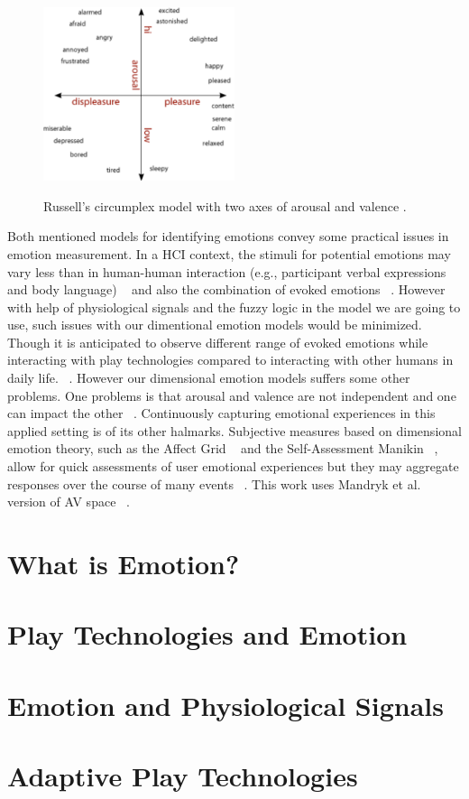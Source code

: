 \begin{figure}[h!]
  \caption[Russell's arousal and valence model]
  {Russell's circumplex model with two axes of arousal and valence \footnotemark.}
  \centering
  \includegraphics[width=0.5\textwidth]{images/russell-av-space.pdf}
  \label{fig:russelavspace}
\end{figure}


Both mentioned models for identifying emotions convey some
practical issues in emotion measurement. In a HCI context, the 
stimuli for potential emotions may vary less than
in human-human interaction (e.g., participant verbal expressions and body language) 
~\cite{zhang2010service} and also the combination of
evoked emotions ~\cite{peter2006emotion}. However with help of physiological
signals and the fuzzy logic in the model we are going to
use, such issues with our dimentional emotion models would
be minimized. Though it is anticipated to observe different range 
of evoked emotions while interacting with play
technologies compared to interacting with other humans in
daily life. ~\cite{zhang2010service}. However our dimensional emotion models
suffers some other problems. One problems is that arousal
and valence are not independent and one can impact the
other ~\cite{mandryk2007fuzzy}. Continuously capturing emotional experiences
in this applied setting is of its other halmarks. Subjective
measures based on dimensional emotion theory, such as the
Affect Grid ~\cite{russell1989affect} and the Self-Assessment 
Manikin ~\cite{bradley1994measuring}, allow
for quick assessments of user emotional experiences but they
may aggregate responses over the course of many events ~\cite{zhang2010service}.
This work uses Mandryk et al. version of AV space ~\cite{mandryk2007fuzzy}.


\section{What is Emotion?}

\section{Play Technologies and Emotion}

\section{Emotion and Physiological Signals}

\section{Adaptive Play Technologies}
